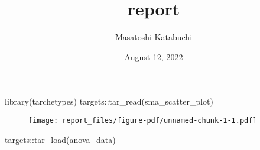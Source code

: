 \documentclass[
  11pt,
  letterpaper,
  DIV=11,
  numbers=noendperiod]{scrartcl}
\title{report}
\author{Masatoshi Katabuchi}
\date{August 12, 2022}
\newenvironment{Shaded}{}{}
\newcommand{\FunctionTok}[1]{\textcolor[rgb]{0.44,0.26,0.76}{#1}}
\newcommand{\NormalTok}[1]{\textcolor[rgb]{0.14,0.16,0.18}{#1}}
\newcommand{\SpecialCharTok}[1]{\textcolor[rgb]{0.00,0.36,0.77}{#1}}
\renewcommand*\contentsname{Table of contents}
\newcommand\contentsname{Table of contents}
\begin{document}
\maketitle
\ifdefined\Shaded\renewenvironment{Shaded}{\begin{tcolorbox}[boxrule=0pt, borderline west={3pt}{0pt}{shadecolor}, enhanced, frame hidden, breakable, sharp corners, interior hidden]}{\end{tcolorbox}}\fi

\renewcommand*\contentsname{Table of contents}
{
\hypersetup{linkcolor=}
\setcounter{tocdepth}{3}
\tableofcontents
}
\begin{Shaded}
\begin{Highlighting}[]
\FunctionTok{library}\NormalTok{(tarchetypes)}
\NormalTok{targets}\SpecialCharTok{::}\FunctionTok{tar\_read}\NormalTok{(sma\_scatter\_plot)}
\end{Highlighting}
\end{Shaded}

\begin{figure}[H]

{\centering \texttt{[image: report\_files/figure-pdf/unnamed-chunk-1-1.pdf]}

}

\end{figure}

\begin{Shaded}
\begin{Highlighting}[]
\NormalTok{targets}\SpecialCharTok{::}\FunctionTok{tar\_load}\NormalTok{(anova\_data)}
\end{Highlighting}
\end{Shaded}
\end{document}
